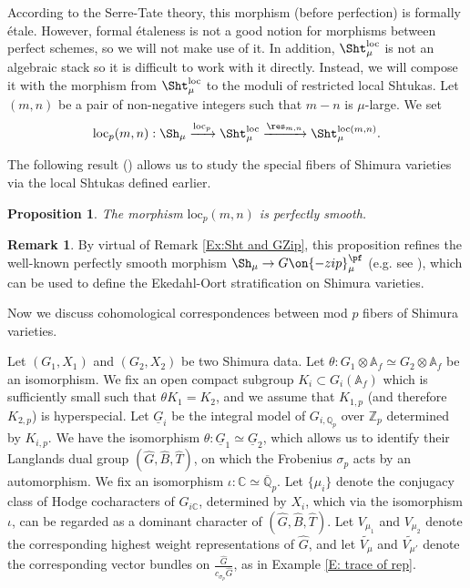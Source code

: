 \documentclass[11pt]{amsart}
\newtheorem{prop}[thm]{Proposition}
\theoremstyle{definition}
\theoremstyle{definition}
\newtheorem{rmk}[thm]{Remark}
\theoremstyle{definition}
\numberwithin{equation}{subsection}
\newcommand{\bA}{{\mathbb A}}
\newcommand{\bC}{{\mathbb C}}
\newcommand{\bQ}{{\mathbb Q}}
\newcommand{\bZ}{{\mathbb Z}}
\newcommand{\loc}{\mathrm{loc}}
\begin{document}
According to the Serre-Tate theory, this morphism (before perfection) is formally \'etale. However, formal \'etaleness is not a good notion for morphisms between perfect schemes, so we will not make use of it. In addition, $\Sht_\mu^\loc$ is not an algebraic stack so it is difficult to work with it directly.  Instead, we will compose it with the morphism from $\Sht_{\mu}^\loc$ to the moduli of restricted local Shtukas. Let $(m,n)$ be a pair of non-negative integers such that $m-n$ is $\mu$-large. We set
\[\loc_p(m,n):\Sh_{\mu}\xrightarrow{\loc_p} \Sht_{\mu}^\loc\xrightarrow{\res_{m,n}} \Sht_{\mu}^{\loc(m,n)}.\]

The following result (\cite[Proposition 7.2.4]{XZ}) allows us to study the special fibers of Shimura varieties via the local Shtukas defined earlier.

\begin{prop}\label{smoothness}
The morphism $\loc_p(m,n)$ is perfectly smooth.
\end{prop}
\begin{rmk}
By virtual of Remark \ref{Ex:Sht and GZip}, this proposition refines the well-known perfectly smooth morphism $\Sh_\mu\to G\on{-zip}^\pf_\mu$ (e.g. see \cite{Zha}), which can be used to define the Ekedahl-Oort stratification on Shimura varieties.
\end{rmk}


Now we discuss cohomological correspondences between mod $p$ fibers of Shimura varieties.  






Let $(G_1,X_1)$ and $(G_2,X_2)$ be two Shimura data. 
Let $\theta: G_1\otimes\bA_f\simeq G_2\otimes\bA_f$ be an isomorphism. We fix an open compact subgroup $K_i\subset G_i(\bA_f)$ which is sufficiently small such that $\theta K_1=K_2$, and
we assume that $K_{1,p}$ (and therefore $K_{2,p}$) is hyperspecial. 
Let $\underline G_i$ be the integral model of $G_{i,\bQ_p}$ over $\bZ_{p}$ determined by $K_{i,p}$. We have the isomorphism $\theta: \underline G_1\simeq \underline G_2$, which allows us to identify their Langlands dual group $(\hat G,\hat B,\hat T)$, on which the Frobenius $\sigma_p$ acts by an automorphism. We fix an isomorphism $\iota: \bC\simeq \overline\bQ_p$.
Let $\{\mu_i\}$ denote the conjugacy class of Hodge cocharacters of $G_{i\bC}$, determined by $X_i$, which via the isomorphism $\iota$, can be regarded as a dominant character of $(\hat G,\hat B,\hat T)$. 
Let $V_{\mu_1}$ and $V_{\mu_2}$ denote the corresponding highest weight representations of $\hat G$, and let $\widetilde{V_{\mu}}$ and $\widetilde{V_{\mu'}}$ denote the corresponding vector bundles on $\frac{\hat G}{c_{\sigma_p}\hat G}$, as in Example \ref{E: trace of rep}.
\end{document}
